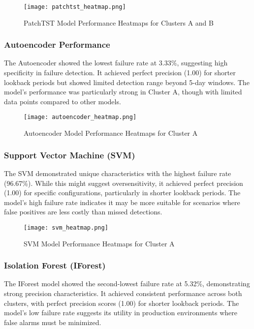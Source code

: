 \documentclass{article}
\begin{document}
\clearpage \begin{figure}[!htb]
\centering
\texttt{[image: patchtst\_heatmap.png]}
\caption{PatchTST Model Performance Heatmaps for Clusters A and B}
\label{fig:patchtst-heatmap}
\end{figure}

\subsubsection{Autoencoder Performance}
The Autoencoder showed the lowest failure rate at 3.33\%, suggesting high specificity in failure detection. It achieved perfect precision (1.00) for shorter lookback periods but showed limited detection range beyond 5-day windows. The model's performance was particularly strong in Cluster A, though with limited data points compared to other models.

\clearpage \begin{figure}[!htb]
\centering
\texttt{[image: autoencoder\_heatmap.png]}
\caption{Autoencoder Model Performance Heatmaps for Cluster A}
\label{fig:autoencoder-heatmap}
\end{figure}

\subsubsection{Support Vector Machine (SVM)}
The SVM demonstrated unique characteristics with the highest failure rate (96.67\%). While this might suggest oversensitivity, it achieved perfect precision (1.00) for specific configurations, particularly in shorter lookback periods. The model's high failure rate indicates it may be more suitable for scenarios where false positives are less costly than missed detections.

\begin{figure}[!htb]
\centering
\texttt{[image: svm\_heatmap.png]}
\caption{SVM Model Performance Heatmaps for Cluster A}
\label{fig:svm-heatmap}
\end{figure}

\subsubsection{Isolation Forest (IForest)}
The IForest model showed the second-lowest failure rate at 5.32\%, demonstrating strong precision characteristics. It achieved consistent performance across both clusters, with perfect precision scores (1.00) for shorter lookback periods. The model's low failure rate suggests its utility in production environments where false alarms must be minimized.
\end{document}
